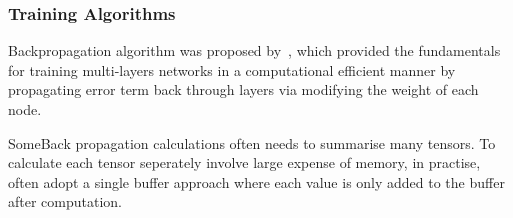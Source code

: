 \subsubsection{Training Algorithms}
Backpropagation algorithm was proposed by~\citet{werbos1975beyond}, which provided the fundamentals for training multi-layers networks in a computational efficient manner by propagating error term back through layers via modifying the weight of each node. 
\par
SomeBack propagation calculations often needs to summarise many tensors. To calculate each tensor seperately involve large expense of memory, in practise, often adopt a single buffer approach where each value is only added to the buffer after computation. 
